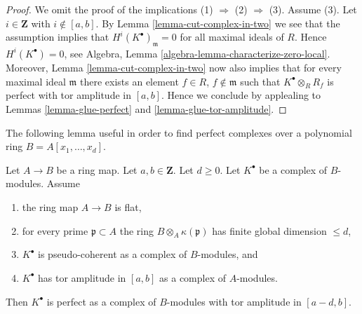 \begin{proof}
We omit the proof of the implications (1) $\Rightarrow$ (2) $\Rightarrow$ (3).
Assume (3). Let $i \in \mathbf{Z}$ with $i \not \in [a, b]$. By
Lemma \ref{lemma-cut-complex-in-two}
we see that the assumption implies that $H^i(K^\bullet)_{\mathfrak m} = 0$
for all maximal ideals of $R$. Hence $H^i(K^\bullet) = 0$, see
Algebra, Lemma \ref{algebra-lemma-characterize-zero-local}.
Moreover,
Lemma \ref{lemma-cut-complex-in-two}
now also implies that for every maximal ideal
$\mathfrak m$ there exists an element $f \in R$, $f \not \in \mathfrak m$
such that $K^\bullet \otimes_R R_f$ is perfect with tor amplitude in
$[a, b]$. Hence we conclude by applealing to
Lemmas \ref{lemma-glue-perfect} and \ref{lemma-glue-tor-amplitude}.
\end{proof}

\noindent
The following lemma useful in order to find perfect complexes
over a polynomial ring $B = A[x_1, \ldots, x_d]$.

\begin{lemma}
\label{lemma-perfect-over-polynomial-ring}
Let $A \to B$ be a ring map. Let $a, b \in \mathbf{Z}$. Let $d \geq 0$.
Let $K^\bullet$ be a complex of $B$-modules. Assume
\begin{enumerate}
\item the ring map $A \to B$ is flat,
\item for every prime $\mathfrak p \subset A$ the ring
$B \otimes_A \kappa(\mathfrak p)$ has finite global dimension $\leq d$,
\item $K^\bullet$ is pseudo-coherent as a complex of $B$-modules, and
\item $K^\bullet$ has tor amplitude in $[a, b]$ as a complex
of $A$-modules.
\end{enumerate}
Then $K^\bullet$ is perfect as a complex of $B$-modules
with tor amplitude in $[a - d, b]$.
\end{lemma}

